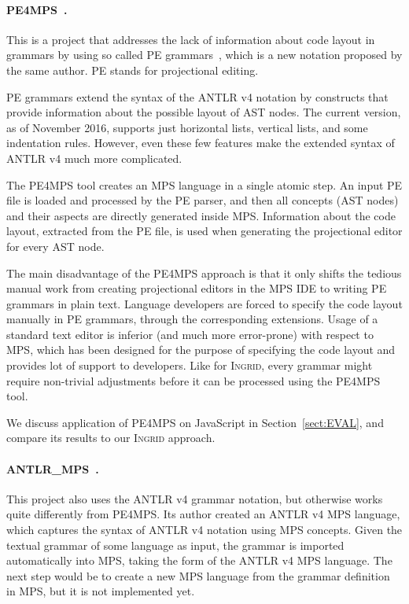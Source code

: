 \paragraph{PE4MPS~\cite{ref:PE4MPS}.} This is a project that addresses the lack of information about code layout in grammars by using so called PE grammars~\cite{ref:PE}, which is a new notation proposed by the same author.
PE stands for projectional editing.

PE grammars extend the syntax of the ANTLR v4 notation by constructs that provide information about the possible layout of AST nodes.
The current version, as of November 2016, supports just horizontal lists, vertical lists, and some indentation rules.
However, even these few features make the extended syntax of ANTLR v4 much more complicated.

The PE4MPS tool creates an MPS language in a single atomic step.
An input PE file is loaded and processed by the PE parser, and then all concepts (AST nodes) and their aspects are directly generated inside MPS.
Information about the code layout, extracted from the PE file, is used when generating the projectional editor for every AST node.

The main disadvantage of the PE4MPS approach is that it only shifts the tedious manual work from creating projectional editors in the MPS IDE to writing PE grammars in plain text.
Language developers are forced to specify the code layout manually in PE grammars, through the corresponding extensions.
Usage of a standard text editor is inferior (and much more error-prone) with respect to MPS, which has been designed for the purpose of specifying the code layout and provides lot of support to developers.
Like for \textsc{Ingrid}, every grammar might require non-trivial adjustments before it can be processed using the PE4MPS tool.

We discuss application of PE4MPS on JavaScript in Section~\ref{sect:EVAL}, and compare its results to our \textsc{Ingrid} approach.

\paragraph{ANTLR{\_}MPS~\cite{ref:ANTLR2MPS}.} This project also uses the ANTLR v4 grammar notation, but otherwise works quite differently from PE4MPS.
Its author created an ANTLR v4 MPS language, which captures the syntax of ANTLR v4 notation using MPS concepts.
Given the textual grammar of some language as input, the grammar is imported automatically into MPS, taking the form of the ANTLR v4 MPS language.
The next step would be to create a new MPS language from the grammar definition in MPS, but it is not implemented yet.

